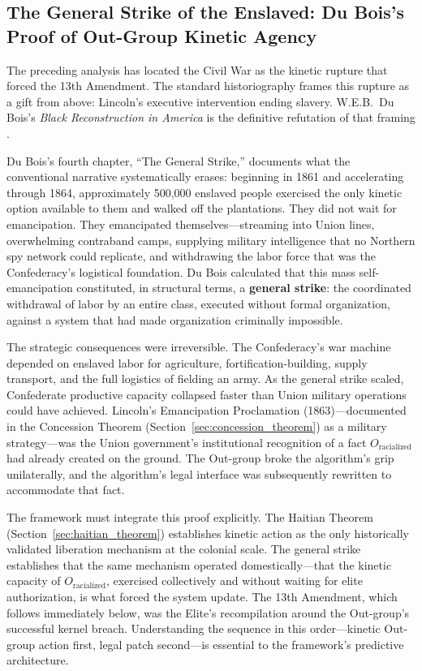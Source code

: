 \subsection{The General Strike of the Enslaved: Du Bois's Proof of Out-Group Kinetic Agency}
\label{sec:general_strike_sub}

The preceding analysis has located the Civil War as the kinetic rupture that forced the 13th Amendment. The standard historiography frames this rupture as a gift from above: Lincoln's executive intervention ending slavery. W.E.B.\ Du Bois's \textit{Black Reconstruction in America} is the definitive refutation of that framing \cite{dubois}.

Du Bois's fourth chapter, ``The General Strike,'' documents what the conventional narrative systematically erases: beginning in 1861 and accelerating through 1864, approximately 500,000 enslaved people exercised the only kinetic option available to them and walked off the plantations. They did not wait for emancipation. They emancipated themselves---streaming into Union lines, overwhelming contraband camps, supplying military intelligence that no Northern spy network could replicate, and withdrawing the labor force that was the Confederacy's logistical foundation. Du Bois calculated that this mass self-emancipation constituted, in structural terms, a \textbf{general strike}: the coordinated withdrawal of labor by an entire class, executed without formal organization, against a system that had made organization criminally impossible.

The strategic consequences were irreversible. The Confederacy's war machine depended on enslaved labor for agriculture, fortification-building, supply transport, and the full logistics of fielding an army. As the general strike scaled, Confederate productive capacity collapsed faster than Union military operations could have achieved. Lincoln's Emancipation Proclamation (1863)---documented in the Concession Theorem (Section~\ref{sec:concession_theorem}) as a military strategy---was the Union government's institutional recognition of a fact $O_{\text{racialized}}$ had already created on the ground. The Out-group broke the algorithm's grip unilaterally, and the algorithm's legal interface was subsequently rewritten to accommodate that fact.

The framework must integrate this proof explicitly. The Haitian Theorem (Section~\ref{sec:haitian_theorem}) establishes kinetic action as the only historically validated liberation mechanism at the colonial scale. The general strike establishes that the same mechanism operated domestically---that the kinetic capacity of $O_{\text{racialized}}$, exercised collectively and without waiting for elite authorization, is what forced the system update. The 13th Amendment, which follows immediately below, was the Elite's recompilation around the Out-group's successful kernel breach. Understanding the sequence in this order---kinetic Out-group action first, legal patch second---is essential to the framework's predictive architecture.

